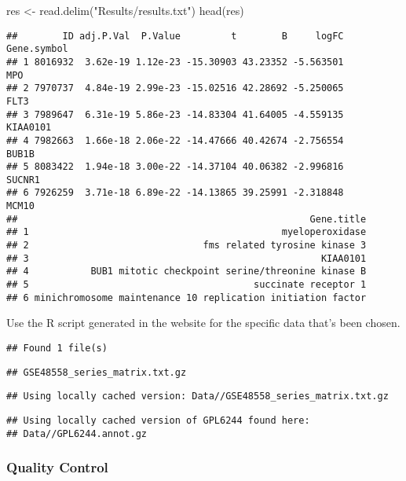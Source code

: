 \documentclass[
]{article}
\newenvironment{Shaded}{\begin{snugshade}}{\end{snugshade}}
\newcommand{\FunctionTok}[1]{\textcolor[rgb]{0.00,0.00,0.00}{#1}}
\newcommand{\NormalTok}[1]{#1}
\newcommand{\OtherTok}[1]{\textcolor[rgb]{0.56,0.35,0.01}{#1}}
\newcommand{\StringTok}[1]{\textcolor[rgb]{0.31,0.60,0.02}{#1}}
\begin{document}
\begin{Shaded}
\begin{Highlighting}[]
\NormalTok{res }\OtherTok{\textless{}{-}} \FunctionTok{read.delim}\NormalTok{(}\StringTok{"Results/results.txt"}\NormalTok{)}
\FunctionTok{head}\NormalTok{(res)}
\end{Highlighting}
\end{Shaded}

\begin{verbatim}
##        ID adj.P.Val  P.Value         t        B     logFC Gene.symbol
## 1 8016932  3.62e-19 1.12e-23 -15.30903 43.23352 -5.563501         MPO
## 2 7970737  4.84e-19 2.99e-23 -15.02516 42.28692 -5.250065        FLT3
## 3 7989647  6.31e-19 5.86e-23 -14.83304 41.64005 -4.559135    KIAA0101
## 4 7982663  1.66e-18 2.06e-22 -14.47666 40.42674 -2.756554       BUB1B
## 5 8083422  1.94e-18 3.00e-22 -14.37104 40.06382 -2.996816      SUCNR1
## 6 7926259  3.71e-18 6.89e-22 -14.13865 39.25991 -2.318848       MCM10
##                                                    Gene.title
## 1                                             myeloperoxidase
## 2                               fms related tyrosine kinase 3
## 3                                                    KIAA0101
## 4           BUB1 mitotic checkpoint serine/threonine kinase B
## 5                                        succinate receptor 1
## 6 minichromosome maintenance 10 replication initiation factor
\end{verbatim}

Use the R script generated in the website for the specific data that's
been chosen.

\begin{verbatim}
## Found 1 file(s)
\end{verbatim}

\begin{verbatim}
## GSE48558_series_matrix.txt.gz
\end{verbatim}

\begin{verbatim}
## Using locally cached version: Data//GSE48558_series_matrix.txt.gz
\end{verbatim}

\begin{verbatim}
## Using locally cached version of GPL6244 found here:
## Data//GPL6244.annot.gz
\end{verbatim}

\hypertarget{quality-control}{%
\subsubsection{Quality Control}\label{quality-control}}
\end{document}
